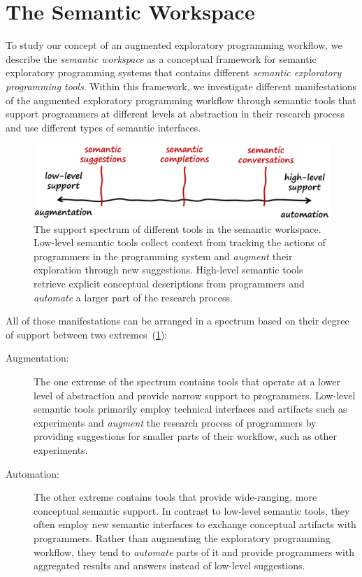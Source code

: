 
\section{The Semantic Workspace}
\label{sec:approach/workspace}

To study our concept of an augmented exploratory programming workflow, we describe the \emph{semantic workspace} as a conceptual framework for semantic exploratory programming systems that contains different \emph{semantic exploratory programming tools}.
Within this framework, we investigate different manifestations of the augmented exploratory programming workflow through semantic tools that support programmers at different levels at abstraction in their research process and use different types of semantic interfaces.

\begin{figure}
	\centering
	\includegraphics[width=.85\textwidth]{02_workspace/spectrum.png}
	\caption[The support spectrum of different \emph{semantic tools} in the semantic workspace.]{
		The support spectrum of different tools in the semantic workspace.
		Low-level semantic tools collect context from tracking the actions of programmers in the programming system and \emph{augment} their exploration through new suggestions.
		High-level semantic tools retrieve explicit conceptual descriptions from programmers and \emph{automate} a larger part of the research process.
	}
	\label{fig:approach/workspace/spectrum}
\end{figure}

All of those manifestations can be arranged in a spectrum based on their degree of support between two extremes~(\cref{fig:approach/workspace/spectrum}):

\begin{description}
	\item[Augmentation:]
	The one extreme of the spectrum contains tools that operate at a lower level of abstraction and provide narrow support to programmers.
	Low-level semantic tools primarily employ technical interfaces and artifacts such as experiments and \emph{augment} the research process of programmers by providing suggestions for smaller parts of their workflow, such as other experiments.

	\item[Automation:]
	The other extreme contains tools that provide wide-ranging, more conceptual semantic support.
	In contrast to low-level semantic tools, they often employ new semantic interfaces to exchange conceptual artifacts with programmers.
	Rather than augmenting the exploratory programming workflow, they tend to \emph{automate} parts of it and provide programmers with aggregated results and answers instead of low-level suggestions.
\end{description}

